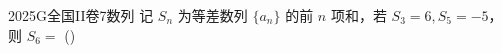 
\begin{problem}{2025}{G}{全国II卷}{7}{数列}
记 $S_n$ 为等差数列 $\{a_n\}$ 的前 $n$ 项和，若 $S_3=6, S_5=-5$，则 $S_6=$
(\hspace{1cm})
\begin{choices}
\end{choices}
\end{problem}